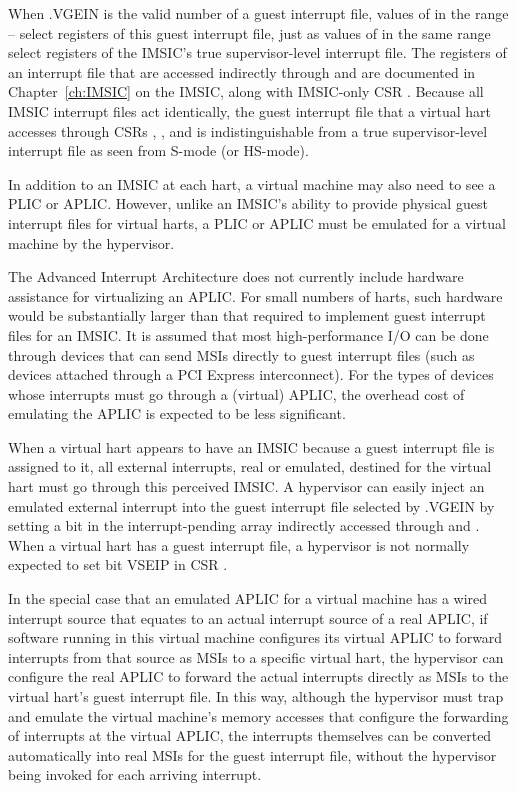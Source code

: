 When .VGEIN is the valid number of a guest interrupt
file, values of  in the range -- select
registers of this guest interrupt file, just as values of 
in the same range select registers of the IMSIC's true supervisor-level
interrupt file.
The registers of an interrupt file that are accessed indirectly through
 and  are documented in Chapter~\ref{ch:IMSIC}
on the IMSIC, along with IMSIC-only CSR .
Because all IMSIC interrupt files act identically, the guest interrupt
file that a virtual hart accesses through CSRs , ,
and  is indistinguishable from a true supervisor-level
interrupt file as seen from \mbox{S-mode} (or \mbox{HS-mode}).

In addition to an IMSIC at each hart, a virtual machine may also need
to see a PLIC or APLIC.
However, unlike an IMSIC's ability to provide physical guest interrupt
files for virtual harts, a PLIC or APLIC must be emulated for a virtual machine
by the hypervisor.

\begin{commentary}
The Advanced Interrupt Architecture does not currently include hardware
assistance for virtualizing an APLIC.
For small numbers of harts, such hardware would be substantially larger
than that required to implement guest interrupt files for an IMSIC.
It is assumed that most high-performance I/O can be done through
devices that can send MSIs directly to guest interrupt files (such as
devices attached through a PCI Express interconnect).
For the types of devices whose interrupts must go through a (virtual)
APLIC, the overhead cost of emulating the APLIC is expected to be less
significant.
\end{commentary}

When a virtual hart appears to have an IMSIC because a guest interrupt
file is assigned to it, all external interrupts, real or emulated,
destined for the virtual hart must go through this perceived IMSIC.
A hypervisor can easily inject an emulated external interrupt into the
guest interrupt file selected by .VGEIN
by setting a bit in the interrupt-pending array
indirectly accessed through  and .
When a virtual hart has a guest interrupt file, a hypervisor
is not normally expected to set bit VSEIP in CSR .

In the special case that an emulated APLIC for a virtual
machine has a wired interrupt source that equates to an actual
interrupt source of a real APLIC, if software running in this
virtual machine configures its virtual APLIC to forward interrupts from
that source as MSIs to a specific virtual hart, the hypervisor can
configure the real APLIC to forward the actual interrupts directly as
MSIs to the virtual hart's guest interrupt file.
In this way, although the hypervisor must trap and emulate the virtual
machine's memory accesses that configure the forwarding of interrupts
at the virtual APLIC, the interrupts themselves can be converted
automatically into real MSIs for the guest interrupt file, without the
hypervisor being invoked for each arriving interrupt.

